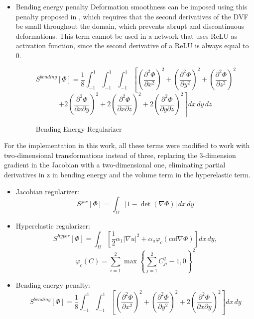\begin{itemize}
    \item Bending energy penalty
    Deformation smoothness can be imposed using this penalty proposed in \cite{bendingenergy}, which
    requires that the second derivatives of the DVF be small throughout the domain, which prevents abrupt and discontinuous deformations.
    This term cannot be used in a network that uses ReLU as activation function, since the second derivative of a ReLU is always equal to 0.

    \begin{figure}[tbp]
        \centering
        \[
        S^{bending}[\Phi] = \frac{1}{8} \int_{-1}^{1} \int_{-1}^{1} \int_{-1}^{1} \left[ \left( \frac{\partial^2 \Phi}{\partial x^2} \right)^2 + \left( \frac{\partial^2 \Phi}{\partial y^2} \right)^2 + \left( \frac{\partial^2 \Phi}{\partial z^2} \right)^2 \right.
        \]
        \[
        \left. + 2 \left( \frac{\partial^2 \Phi}{\partial x \partial y} \right)^2 + 2 \left( \frac{\partial^2 \Phi}{\partial x \partial z} \right)^2 + 2 \left( \frac{\partial^2 \Phi}{\partial y \partial z} \right)^2 \right] dx\,dy\,dz
        \]
        \caption{Bending Energy Regularizer}
    \end{figure}
    
\end{itemize}

For the implementation in this work, all these terms were modified to work with two-dimensional transformations instead of three,
replacing the 3-dimension gradient in the Jacobian with a two-dimensional one, eliminating partial derivatives in z in bending energy and the volume term in the hyperelastic term.

\begin{itemize}
    \item Jacobian regularizer:\\
    \[
    S^{jac}[\Phi] = \int_{\Omega} \left| 1 - \det \left( \nabla \Phi \right) \right| \, dx \, dy
    \]
    \item Hyperelastic regularizer:\\
    \[
    S^{hyper}[\Phi] = \int_{\Omega} \left[ \frac{1}{2} \alpha_1 |\nabla u|^2 + \alpha_a \varphi_c (\text{cof} \nabla \Phi) \right] dx \, dy,
    \]
    \[
    \varphi_c(C) = \sum_{i=1}^2 \max \left\{ \sum_{j=1}^2 C_{ji}^2 - 1, 0 \right\}^2
    \]
    \item Bending energy penalty:\\
    \[
    S^{bending}[\Phi] = \frac{1}{8} \int_{-1}^{1} \int_{-1}^{1} \left[ \left( \frac{\partial^2 \Phi}{\partial x^2} \right)^2 + \left( \frac{\partial^2 \Phi}{\partial y^2} \right)^2 + 2 \left( \frac{\partial^2 \Phi}{\partial x \partial y} \right)^2 \right] dx \, dy
    \]
\end{itemize}

